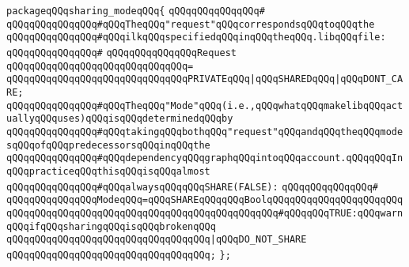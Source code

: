\newline
\newline
\verb|packageqQQqsharing_modeqQQq{|\newline
\verb|qQQqqQQqqQQqqQQq#|\newline
\verb|qQQqqQQqqQQqqQQq#qQQqTheqQQq"request"qQQqcorrespondsqQQqtoqQQqthe|\newline
\verb|qQQqqQQqqQQqqQQq#qQQqilkqQQqspecifiedqQQqinqQQqtheqQQq.libqQQqfile:|\newline
\verb|qQQqqQQqqQQqqQQq#|\newline
\verb|qQQqqQQqqQQqqQQqRequest|\newline
\verb|qQQqqQQqqQQqqQQqqQQqqQQqqQQqqQQq=|\newline
\verb|qQQqqQQqqQQqqQQqqQQqqQQqqQQqqQQqPRIVATEqQQq|\verb#|qQQqSHAREDqQQq|qQQqDONT_CARE;#\newline
\newline
\verb|qQQqqQQqqQQqqQQq#qQQqTheqQQq"Mode"qQQq(i.e.,qQQqwhatqQQqmakelibqQQqactuallyqQQquses)qQQqisqQQqdeterminedqQQqby|\newline
\verb|qQQqqQQqqQQqqQQq#qQQqtakingqQQqbothqQQq"request"qQQqandqQQqtheqQQqmodesqQQqofqQQqpredecessorsqQQqinqQQqthe|\newline
\verb|qQQqqQQqqQQqqQQq#qQQqdependencyqQQqgraphqQQqintoqQQqaccount.qQQqqQQqInqQQqpracticeqQQqthisqQQqisqQQqalmost|\newline
\verb|qQQqqQQqqQQqqQQq#qQQqalwaysqQQqqQQqSHARE(FALSE):|\newline
\verb|qQQqqQQqqQQqqQQq#|\newline
\verb|qQQqqQQqqQQqqQQqModeqQQq=qQQqSHAREqQQqqQQqBoolqQQqqQQqqQQqqQQqqQQqqQQqqQQqqQQqqQQqqQQqqQQqqQQqqQQqqQQqqQQqqQQqqQQqqQQq#qQQqqQQqTRUE:qQQqwarnqQQqifqQQqsharingqQQqisqQQqbrokenqQQq|\newline
\verb|qQQqqQQqqQQqqQQqqQQqqQQqqQQqqQQqqQQq|\verb#|qQQqDO_NOT_SHARE#\newline
\verb|qQQqqQQqqQQqqQQqqQQqqQQqqQQqqQQqqQQq;|\newline
\verb|};|\newline

